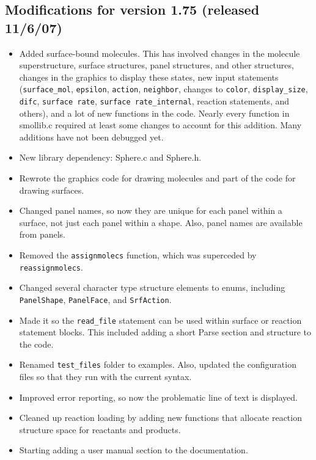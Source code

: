 \documentclass {scrbook}
\newcommand {\ttt} {\texttt}
\begin{document}
\subsection{Modifications for version 1.75 (released 11/6/07)}
\begin{itemize}
\item Added surface-bound molecules. This has involved changes in the molecule superstructure, surface structures, panel structures, and other structures, changes in the graphics to display these states, new input statements (\ttt{surface\_mol}, \ttt{epsilon}, \ttt{action}, \ttt{neighbor}, changes to \ttt{color}, \ttt{display\_size}, \ttt{difc}, \ttt{surface rate}, \ttt{surface rate\_internal}, reaction statements, and others), and a lot of new functions in the code. Nearly every function in smollib.c required at least some changes to account for this addition. Many additions have not been debugged yet.
\item New library dependency: Sphere.c and Sphere.h.
\item Rewrote the graphics code for drawing molecules and part of the code for drawing surfaces.
\item Changed panel names, so now they are unique for each panel within a surface, not just each panel within a shape. Also, panel names are available from panels.
\item Removed the \ttt{assignmolecs} function, which was superceded by \ttt{reassignmolecs}.
\item Changed several character type structure elements to enums, including \ttt{PanelShape}, \ttt{PanelFace}, and \ttt{SrfAction}.
\item Made it so the \ttt{read\_file} statement can be used within surface or reaction statement blocks. This included adding a short Parse section and structure to the code.
\item Renamed \ttt{test\_files} folder to examples. Also, updated the configuration files so that they run with the current syntax.
\item Improved error reporting, so now the problematic line of text is displayed.
\item Cleaned up reaction loading by adding new functions that allocate reaction structure space for reactants and products.
\item Starting adding a user manual section to the documentation.
\end{itemize}
\end{document}
